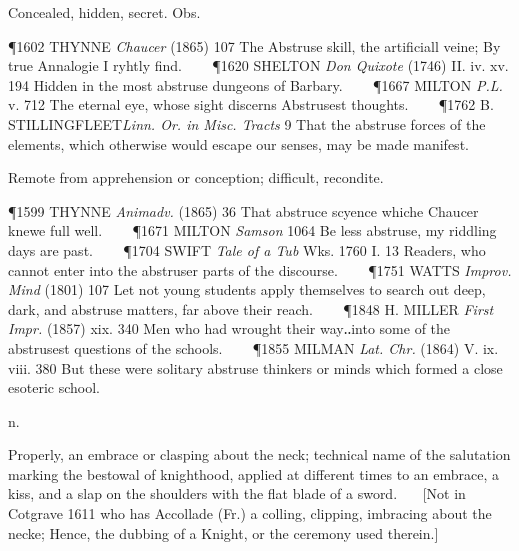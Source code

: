 \begin{description}[wide, labelwidth=!, labelindent=0pt]
\begin{myenumerate}
 Concealed, hidden, secret. Obs. 

\P 1602 THYNNE \textit{Chaucer} (1865) 107 The Abstruse skill, the artificiall veine; By
true Annalogie I ryhtly find.    
\P 1620 SHELTON \textit{Don Quixote} (1746) II. iv. xv. 194
Hidden in the most abstruse dungeons of Barbary.    
\P 1667 MILTON \textit{P.L.} v. 712 The
eternal eye, whose sight discerns Abstrusest thoughts.    
\P 1762 B. STILLINGFLEET\textit{Linn. Or. in Misc. Tracts} 9 That the abstruse forces 
of the elements, which otherwise would escape our senses, may be made manifest.

 Remote from apprehension or conception; difficult, recondite. 

\P 1599 THYNNE \textit{Animadv.} (1865) 36 That abstruce scyence whiche Chaucer knewe
full well.    
\P 1671 MILTON \textit{Samson} 1064 Be less abstruse, my riddling days are
past.    
\P 1704 SWIFT \textit{Tale of a Tub} Wks. 1760 I. 13 Readers, who cannot enter into
the abstruser parts of the discourse.    
\P 1751 WATTS \textit{Improv. Mind} (1801) 107 Let
not young students apply themselves to search out deep, dark, and abstruse
matters, far above their reach.    
\P 1848 H. MILLER \textit{First Impr.} (1857) xix. 340
Men who had wrought their way‥into some of the abstrusest questions of the
schools.    
\P 1855 MILMAN \textit{Lat. Chr.} (1864) V. ix. viii. 380 But these were
solitary abstruse thinkers or minds which formed a close esoteric school.
\end{myenumerate}
 


  n.

\noindent {}

\vspace{-0.3cm}

\begin{myenumerate}
 Properly, an embrace or clasping about the neck; technical name of the
salutation marking the bestowal of knighthood, applied at different times to an
embrace, a kiss, and a slap on the shoulders with the flat blade of a sword.
   [Not in Cotgrave 1611 who has Accollade (Fr.) a colling, clipping, imbracing
about the necke; Hence, the dubbing of a Knight, or the ceremony used therein.] 


\end{myenumerate}
\end{description}
